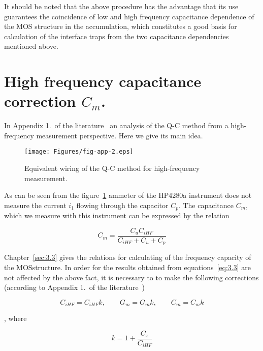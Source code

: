 It should be noted that the above procedure has the advantage that its
use guarantees the coincidence of low and high frequency capacitance
dependence of the MOS structure in the accumulation, which constitutes
a good basis for calculation of the interface traps from the two
capacitance dependencies mentioned above.

\section{High frequency capacitance correction $C_m$.}\label{sec:E.4}

In Appendix 1.\ of the literature~\cite{App.2} an analysis of the Q-C
method from a high-frequency measurement perspective. Here we give its
main idea.

\begin{figure}[h!]\centering
  \texttt{[image: Figures/fig-app-2.eps]}
  \caption[Equivalent wiring of the Q-C method for high-frequency
    measurements]{Equivalent wiring of the Q-C method for
    high-frequency measurement.}\label{fig:App.2}
\end{figure}

As can be seen from the figure~\ref{fig:App.2} ammeter of the HP4280a
instrument does not measure the current $i_1$ flowing through the
capacitor $C_p$. The capacitance $C_m$, which we measure with this
instrument can be expressed by the relation

\begin{equation}\label{eq:E.6}
  C_m = \frac{C_{u} C_{iHF}} {C_{iHF}+C_{u}+C_{p}}
\end{equation}

Chapter~\ref{sec:3.3} gives the relations for calculating of the
frequency capacity of the MOS\@ structure.  In order for the results
obtained from equations~\ref{eq:3.3} are not affected by the above
fact, it is necessary to to make the following corrections (according
to Appendix 1.\ of the literature~\cite{App.4})

\begin{equation}\label{eq:E.7}
  C_{iHF}=C_{iHF}k, \qquad G_{m}=G_{m}k, \qquad C_{m}=C_{m}k
\end{equation}

, where

\begin{equation}\label{eq:E.8}
  k = 1 + \frac{C_x}{C_{iHF}}
\end{equation}
